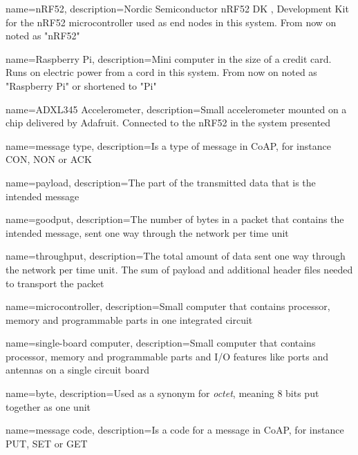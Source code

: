 \pagestyle{empty}


{
	name=nRF52,
    description={Nordic Semiconductor nRF52 DK , Development Kit for the nRF52 microcontroller used as end nodes in this system. From now on noted as "nRF52"}
}

{
	name=Raspberry Pi,
    description={Mini computer in the size of a credit card. Runs on electric power from a cord in this system. From now on noted as "Raspberry Pi" or shortened to "Pi"}
}

{
	name=ADXL345 Accelerometer,
    description={Small accelerometer mounted on a chip delivered by Adafruit. Connected to the nRF52 in the system presented}
}


{
    name=message type,
    description={Is a type of message in CoAP, for instance CON, NON or ACK}
}

{
    name=payload,
    description={The part of the transmitted data that is the intended message}
}

{
	name=goodput,
	description={The number of bytes in a packet that contains the intended message, sent one way through the network per time unit}
}

{
	name=throughput,
	description={The total amount of data sent one way through the network per time unit. The sum of payload and additional header files needed to transport the packet}
}

{
    name=microcontroller,
    description={Small computer that contains processor, memory and programmable parts in one integrated circuit}
}

{
    name=single-board computer,
    description={Small computer that contains processor, memory and programmable parts and I/O features like ports and antennas on a single circuit board}
}

{
    name=byte,
    description={Used as a synonym for \textit{octet}, meaning 8 bits put together as one unit}
}

{
    name=message code,
    description={Is a code for a message in CoAP, for instance PUT, SET or GET}
}


